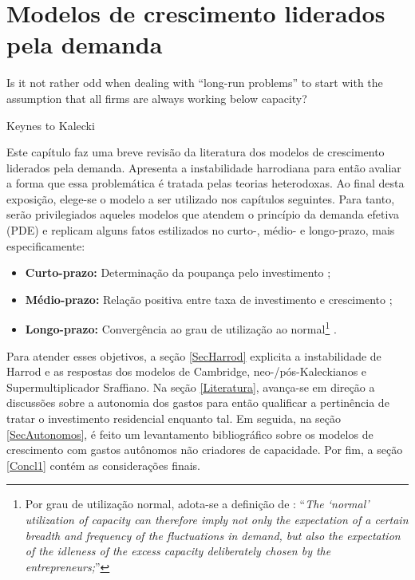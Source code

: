 \chapter{Modelos de crescimento liderados pela demanda}
\label{CapTeorico}

\epigraph{Is it not rather odd when dealing with ``long-run problems'' to start with the assumption that all firms are always working below capacity?}{Keynes to Kalecki}


Este capítulo faz uma breve revisão da literatura dos modelos de crescimento liderados pela demanda. Apresenta a instabilidade harrodiana para então avaliar a forma que essa problemática é tratada pelas teorias heterodoxas.
Ao final desta exposição,  elege-se o modelo a ser utilizado nos capítulos seguintes.
Para tanto, serão privilegiados aqueles modelos que atendem o princípio da demanda efetiva (PDE)  e replicam alguns fatos estilizados no curto-, médio- e longo-prazo, mais especificamente:
\begin{itemize}
	\item \textbf{Curto-prazo:} Determinação da poupança pelo investimento \cite{keynes_general_1936};
	\item \textbf{Médio-prazo:} Relação positiva entre taxa de investimento e crescimento \cite{cesaratto_neo-kaleckian_2015};
	\item \textbf{Longo-prazo:} Convergência ao grau de utilização ao normal\footnote{Por grau de utilização normal, adota-se a definição de \textcites[p.~423--4, Original de 1986]{ciccone_2017}: ``\textit{The `normal' utilization of capacity can therefore imply not only the expectation of a certain breadth and frequency of the fluctuations in demand, but also the expectation of the idleness of the excess capacity deliberately chosen by the entrepreneurs;}'' } \cites{ciccone_2017}{vianello_pace_1985}.
\end{itemize}



Para atender esses objetivos, a seção \ref{SecHarrod} explicita a instabilidade de Harrod e as respostas dos modelos de Cambridge, neo-/pós-Kaleckianos e Supermultiplicador Sraffiano. 
Na seção \ref{Literatura}, avança-se em direção a discussões sobre a autonomia dos gastos para então qualificar a pertinência de tratar o investimento residencial enquanto tal.
Em seguida, na seção \ref{SecAutonomos}, é feito um levantamento bibliográfico sobre os modelos de crescimento com gastos autônomos não criadores de capacidade. 
Por fim, a seção \ref{Concl1} contém as considerações finais.







